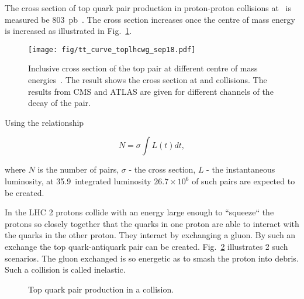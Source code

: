 The cross section of top quark pair production in proton-proton collisions at ~\TeV is measured be 803~pb~\cite{Sirunyan:2018goh}. The cross section increases once the centre of mass energy is increased as illustrated in Fig.~\ref{fig:tt_curve_toplhcwg_sep18}.

\begin{figure}[hbtp]
  \centering
  \texttt{[image: fig/tt\_curve\_toplhcwg\_sep18.pdf]}
  \caption{Inclusive cross section of the top pair at different centre of mass energies~\cite{twiki:tt_curve_toplhcwg_sep18}. The result shows the cross section at \Pp\Pp and \Pp\Pap collisions. The results from CMS and ATLAS are given for different channels of the decay of the \ttbar pair.}
  \label{fig:tt_curve_toplhcwg_sep18}
\end{figure}

Using the relationship

\begin{equation}
N=\sigma\int L(t)dt,
\end{equation}

\noindent where $N$ is the number of \ttbar pairs, $\sigma$ - the \ttbar cross section, $L$ - the instantaneous luminosity, at 35.9~\fbinv integrated luminosity $26.7\times10^{6}$ of such pairs are expected to be created. 

In the LHC 2 protons collide with an energy large enough to ``squeeze`` the protons so closely together that the quarks in one proton are able to interact with the quarks in the other proton. They interact by exchanging a gluon. By such an exchange the top quark-antiquark pair can be created. Fig.~\ref{fig:top_quark_productions} illustrates 2 such scenarios. The gluon exchanged is so energetic as to smash the proton into debris. Such a collision is called inelastic.

\begin{figure}[h!]
  \centering
  \def\twidth{0.3}
  \hfil

  \caption{Top quark pair production in a \Pp\Pp collision.}
  \label{fig:top_quark_productions}
\end{figure}

